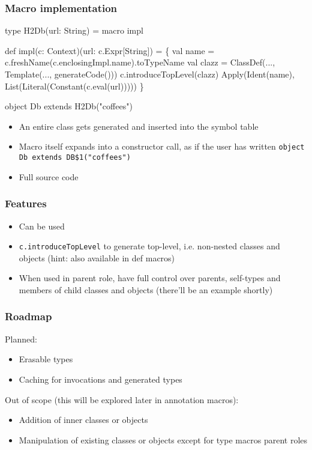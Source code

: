 \documentclass[svgnames,hyperref={bookmarks=false}]{beamer}
\begin{document}
\begin{frame}[fragile]
\frametitle{Macro implementation}
\begin{semiverbatim}
type H2Db(url: String) = macro impl

def impl(c: Context)(url: c.Expr[String]) = \{
  val name = c.freshName(c.enclosingImpl.name).toTypeName
  val clazz = ClassDef(..., Template(..., generateCode()))
  c.introduceTopLevel(clazz)
  Apply(Ident(name), List(Literal(Constant(c.eval(url)))))
\}

object Db extends H2Db("coffees")
\end{semiverbatim}

\begin{itemize}
\item An entire class gets generated and inserted into the symbol table
\item Macro itself expands into a constructor call, as if the user has written \texttt{object Db extends DB\$1("coffees")}
\item Full source code 
\end{itemize}
\end{frame}

\begin{frame}[fragile]
\frametitle{Features}

\begin{itemize}
\item Can be used 
\item \texttt{c.introduceTopLevel} to generate top-level, i.e. non-nested classes and objects (hint: also available in def macros)
\item When used in parent role, have full control over parents, self-types and members of child classes and objects (there'll be an example shortly)
\end{itemize}
\end{frame}

\begin{frame}[fragile]
\frametitle{Roadmap}

Planned:
\begin{itemize}
\item Erasable types
\item Caching for invocations and generated types
\end{itemize}
\vskip25pt
Out of scope (this will be explored later in annotation macros):
\begin{itemize}
\item Addition of inner classes or objects
\item Manipulation of existing classes or objects except for type macros parent roles
\end{itemize}
\end{frame}
\end{document}
